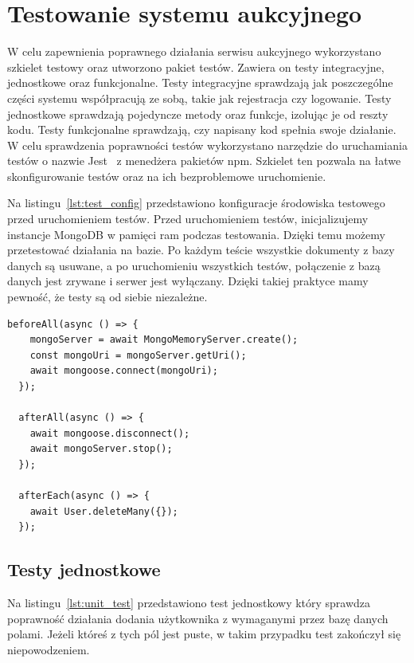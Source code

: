 \section{Testowanie systemu aukcyjnego}
W celu zapewnienia poprawnego działania serwisu aukcyjnego wykorzystano szkielet testowy oraz utworzono pakiet testów. Zawiera on testy integracyjne, jednostkowe oraz funkcjonalne.
Testy integracyjne sprawdzają jak poszczególne części systemu współpracują ze sobą, takie jak rejestracja czy logowanie. Testy jednostkowe sprawdzają pojedyncze metody oraz funkcje, izolując je od reszty kodu. Testy funkcjonalne sprawdzają, czy napisany kod spełnia swoje działanie.  \\
W celu sprawdzenia poprawności testów wykorzystano narzędzie do uruchamiania testów o nazwie Jest~\cite{Jest} z menedżera pakietów npm. Szkielet ten pozwala na łatwe skonfigurowanie testów oraz na ich bezproblemowe uruchomienie.

Na listingu~\ref{lst:test_config} przedstawiono konfiguracje środowiska testowego przed uruchomieniem testów. Przed uruchomieniem testów, inicjalizujemy instancje MongoDB w pamięci ram podczas testowania. Dzięki temu możemy przetestować działania na bazie. Po każdym teście wszystkie dokumenty z bazy danych są usuwane, a po uruchomieniu wszystkich testów, połączenie z bazą danych jest zrywane i serwer jest wyłączany. Dzięki takiej praktyce mamy pewność, że testy są od siebie niezależne.

\begin{lstlisting}[style=javascript, caption = {Konfiguracja środowiska testowego}, label = {lst:test_config}]
beforeAll(async () => {
    mongoServer = await MongoMemoryServer.create();
    const mongoUri = mongoServer.getUri();
    await mongoose.connect(mongoUri);
  });

  afterAll(async () => {
    await mongoose.disconnect();
    await mongoServer.stop();
  });

  afterEach(async () => {
    await User.deleteMany({});
  });
\end{lstlisting}

\vspace{3cm}
\subsection{Testy jednostkowe}

Na listingu~\ref{lst:unit_test} przedstawiono test jednostkowy który sprawdza poprawność działania dodania użytkownika z wymaganymi przez bazę danych polami. Jeżeli któreś z tych pól jest puste, w takim przypadku test zakończył się niepowodzeniem.

